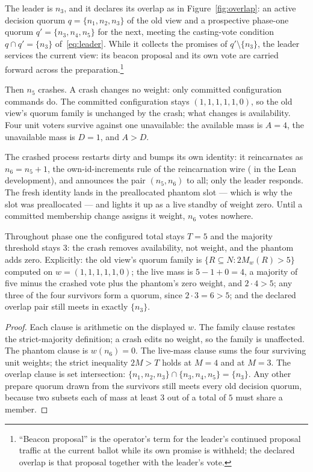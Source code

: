 The leader is $n_3$, and it declares its overlap as in
Figure~\ref{fig:overlap}: an active decision quorum $q=\{n_1,n_2,n_3\}$ of the
old view and a prospective phase-one quorum $q'=\{n_3,n_4,n_5\}$ for the next,
meeting the casting-vote condition $q\cap q'=\{n_3\}$ of~\eqref{eq:leader}.
While it collects the promises of $q'\setminus\{n_3\}$, the leader services the
current view: its beacon proposal and its own vote are carried forward across
the preparation.\footnote{``Beacon proposal'' is the operator's term for the
leader's continued proposal traffic at the current ballot while its own promise
is withheld; the declared overlap is that proposal together with the leader's
vote.}

Then $n_5$ crashes. A crash changes no weight: only committed configuration
commands do. The committed configuration stays $(1,1,1,1,1,0)$, so the old
view's quorum family is unchanged by the crash; what changes is availability.
Four unit voters survive against one unavailable: the available mass is $A=4$,
the unavailable mass is $D=1$, and $A>D$.

The crashed process restarts dirty and bumps its own identity: it reincarnates
as $n_6=n_5{+}1$, the own-id-increments rule of the reincarnation wire
( in the Lean development), and announces the pair
$(n_5,n_6)$ to all; only the leader responds. The fresh identity lands in the
preallocated phantom slot --- which is why the slot was preallocated --- and
lights it up as a live standby of weight zero. Until a committed membership
change assigns it weight, $n_6$ votes nowhere.

\begin{proposition}\label{prop:phantom}
Throughout phase one the configured total stays $T=5$ and the majority
threshold stays $3$: the crash removes availability, not weight, and the
phantom adds zero. Explicitly: the old view's quorum family is
$\{R\subseteq N:2M_w(R)>5\}$ computed on $w=(1,1,1,1,1,0)$; the live mass is
$5-1+0=4$, a majority of five minus the crashed vote plus the phantom's zero
weight, and $2\cdot4>5$; any three of the four survivors form a quorum, since
$2\cdot3=6>5$; and the declared overlap pair still meets in exactly
$\{n_3\}$.
\end{proposition}
\begin{proof}
Each clause is arithmetic on the displayed $w$. The family clause restates the
strict-majority definition; a crash edits no weight, so the family is
unaffected. The phantom clause is $w(n_6)=0$. The live-mass clause sums the
four surviving unit weights; the strict inequality $2M>T$ holds at $M=4$ and at
$M=3$. The overlap clause is set intersection:
$\{n_1,n_2,n_3\}\cap\{n_3,n_4,n_5\}=\{n_3\}$. Any other prepare quorum drawn
from the survivors still meets every old decision quorum, because two subsets
each of mass at least $3$ out of a total of $5$ must share a member.
\end{proof}

